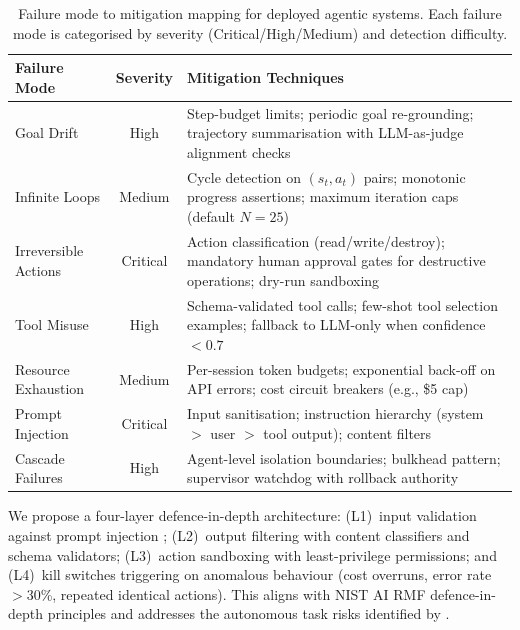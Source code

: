 \documentclass[review,authoryear]{elsarticle}
\theoremstyle{definition}
\begin{document}
\begin{table}[ht]
\centering
\caption{Failure mode to mitigation mapping for deployed agentic systems. Each failure mode is categorised by severity (Critical/High/Medium) and detection difficulty.}
\label{tab:failures}
\begin{tabular}{p{2.5cm}cp{8cm}}
\toprule
\textbf{Failure Mode} & \textbf{Severity} & \textbf{Mitigation Techniques} \\
\midrule
Goal Drift & High & Step-budget limits; periodic goal re-grounding; trajectory summarisation with LLM-as-judge alignment checks \citep{zheng2024judging} \\
Infinite Loops & Medium & Cycle detection on $(s_t, a_t)$ pairs; monotonic progress assertions; maximum iteration caps (default $N{=}25$) \\
Irreversible Actions & Critical & Action classification (read/write/destroy); mandatory human approval gates for destructive operations; dry-run sandboxing \\
Tool Misuse & High & Schema-validated tool calls; few-shot tool selection examples; fallback to LLM-only when confidence $< 0.7$ \\
Resource Exhaustion & Medium & Per-session token budgets; exponential back-off on API errors; cost circuit breakers (e.g., \$5 cap) \\
Prompt Injection & Critical & Input sanitisation; instruction hierarchy (system $>$ user $>$ tool output); content filters \citep{greshake2023not,guardrailsai2024} \\
Cascade Failures & High & Agent-level isolation boundaries; bulkhead pattern; supervisor watchdog with rollback authority \\
\bottomrule
\end{tabular}
\end{table}

We propose a four-layer defence-in-depth architecture: (L1)~input validation against prompt injection \citep{greshake2023not}; (L2)~output filtering with content classifiers and schema validators; (L3)~action sandboxing with least-privilege permissions; and (L4)~kill switches triggering on anomalous behaviour (cost overruns, error rate $>$30\%, repeated identical actions). This aligns with NIST AI RMF \citep{nist2023ai} defence-in-depth principles and addresses the autonomous task risks identified by \citet{kinniment2024evaluating}.

\end{document}
